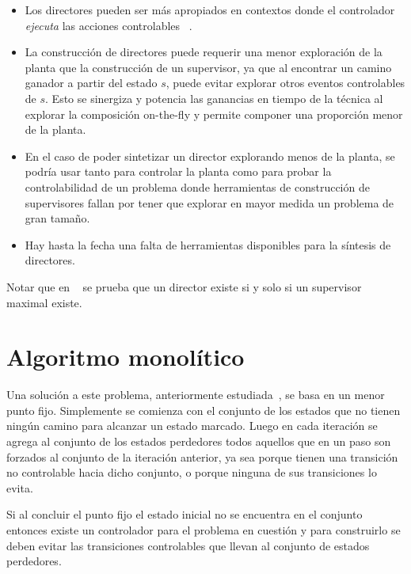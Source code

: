 \begin{itemize}
	\item Los directores pueden ser más apropiados en contextos donde el controlador \textit{ejecuta} las acciones controlables ~\cite{Huang:2008:DCD}.
	
	\item La construcción de directores puede requerir una menor exploración de la planta que la construcción de un supervisor, ya que al encontrar un camino ganador a partir del estado $s$, puede evitar explorar otros eventos controlables de $s$. Esto se sinergiza y potencia las ganancias en tiempo de la técnica al explorar la composición on-the-fly y permite componer una proporción menor de la planta.
	
	\item En el caso de poder sintetizar un director explorando menos de la planta, se podría usar tanto para controlar la planta como para probar la controlabilidad de un problema donde herramientas de construcción de supervisores fallan por tener que explorar en mayor medida un problema de gran tamaño.
	
	\item Hay hasta la fecha una falta de herramientas disponibles para la síntesis de directores.
\end{itemize}

Notar que en ~\cite{Huang:2008:DCD} se prueba que un director existe si y solo si un supervisor maximal existe.

\section{Algoritmo monolítico} \label{chpt:algoMono}

Una solución a este problema, anteriormente estudiada~\cite{Ehlers:EECS-2013-162}, se basa en un menor punto fijo. Simplemente se comienza con el conjunto de los estados que no tienen ningún camino para alcanzar un estado marcado. Luego en cada iteración se agrega al conjunto de los estados perdedores todos aquellos que en un paso son forzados al conjunto de la iteración anterior, ya sea porque tienen una transición no controlable hacia dicho conjunto, o porque ninguna de sus transiciones lo evita. 

Si al concluir el punto fijo el estado inicial no se encuentra en el conjunto entonces existe un controlador para el problema en cuestión y para construirlo se deben evitar las transiciones controlables que llevan al conjunto de estados perdedores.

